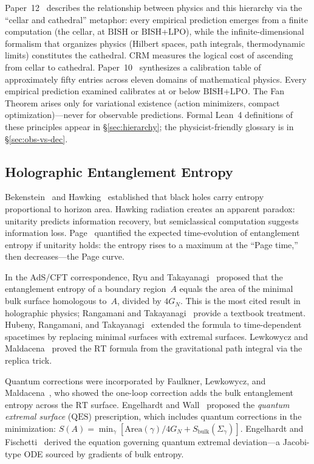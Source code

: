\documentclass[11pt,a4paper]{article}
\theoremstyle{plain}
\theoremstyle{definition}
\newcommand{\LPO}{\ensuremath{\mathrm{LPO}}}
\newcommand{\BISH}{\ensuremath{\mathrm{BISH}}}
\newcommand{\RT}{\ensuremath{\mathrm{RT}}}
\newcommand{\QES}{\ensuremath{\mathrm{QES}}}
\newcommand{\GN}{\ensuremath{G_N}}
\begin{document}
Paper~12~\cite{Lee26P12} describes the relationship between
physics and this hierarchy via the ``cellar and cathedral'' metaphor:
every empirical prediction emerges from a finite computation (the
cellar, at $\BISH$ or $\BISH$+$\LPO$), while the
infinite-dimensional formalism that organizes physics (Hilbert
spaces, path integrals, thermodynamic limits) constitutes the
cathedral.  CRM measures the logical cost of ascending from cellar
to cathedral.  Paper~10~\cite{Lee26P10} synthesizes a calibration
table of approximately fifty entries across eleven domains of
mathematical physics.  Every empirical prediction examined
calibrates at or below $\BISH$+$\LPO$.  The Fan Theorem arises
only for variational existence (action minimizers, compact
optimization)---never for observable predictions.
Formal Lean~4 definitions of these principles appear in
\S\ref{sec:hierarchy}; the physicist-friendly glossary is in
\S\ref{sec:obs-vs-dec}.

\subsection{Holographic Entanglement Entropy}\label{sec:hee-bg}

Bekenstein~\cite{Bekenstein1973} and Hawking~\cite{Hawking1975}
established that black holes carry entropy proportional to horizon
area.  Hawking radiation creates an apparent paradox: unitarity
predicts information recovery, but semiclassical computation
suggests information loss.  Page~\cite{Page1993} quantified the
expected time-evolution of entanglement entropy if unitarity holds:
the entropy rises to a maximum at the ``Page time,'' then
decreases---the Page curve.

In the AdS/CFT correspondence, Ryu and Takayanagi~\cite{RT2006}
proposed that the entanglement entropy of a boundary region~$A$
equals the area of the minimal bulk surface homologous to~$A$,
divided by $4\GN$.  This is the most cited result in holographic
physics; Rangamani and Takayanagi~\cite{RaTa2017} provide a
textbook treatment.  Hubeny, Rangamani, and
Takayanagi~\cite{HRT2007} extended the formula to time-dependent
spacetimes by replacing minimal surfaces with extremal surfaces.
Lewkowycz and Maldacena~\cite{LM2013} proved the $\RT$ formula
from the gravitational path integral via the replica trick.

Quantum corrections were incorporated by Faulkner, Lewkowycz,
and Maldacena~\cite{FLM2013}, who showed the one-loop correction
adds the bulk entanglement entropy across the $\RT$ surface.
Engelhardt and Wall~\cite{EW2015} proposed the \emph{quantum
extremal surface} ($\QES$) prescription, which includes quantum
corrections in the minimization: $S(A) = \min_\gamma
[\text{Area}(\gamma)/4\GN + S_{\text{bulk}}(\Sigma_\gamma)]$.
Engelhardt and Fischetti~\cite{EF2019} derived the equation
governing quantum extremal deviation---a Jacobi-type ODE sourced
by gradients of bulk entropy.
\end{document}
